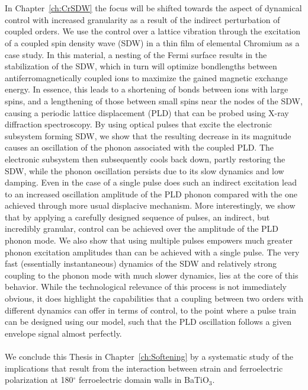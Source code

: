 \\\\
In Chapter~\ref{ch:CrSDW} the focus will be shifted towards the aspect of dynamical control with increased granularity as a result of the indirect perturbation of coupled orders.
We use the control over a lattice vibration through the excitation of a coupled spin density wave (SDW) in a thin film of elemental Chromium as a case study.
In this material, a nesting of the Fermi surface results in the stabilization of the SDW, which in turn will optimize bondlengths between antiferromagnetically coupled ions to maximize the gained magnetic exchange energy.
In essence, this leads to a shortening of bonds between ions with large spins, and a lengthening of those between small spins near the nodes of the SDW, causing a periodic lattice displacement (PLD) that can be probed using X-ray diffraction spectroscopy.
By using optical pulses that excite the electronic subsystem forming SDW, we show that the resulting  decrease in its magnitude causes an oscillation of the phonon associated with the coupled PLD.
The electronic subsystem then subsequently cools back down, partly restoring the SDW, while the phonon oscillation persists due to its slow dynamics and low damping.
Even in the case of a single pulse does such an indirect excitation lead to an increased oscillation amplitude of the PLD phonon compared with the one achieved through more usual displacive mechanism.
More interestingly, we show that by applying a carefully designed sequence of pulses, an indirect, but incredibly granular, control can be achieved over the amplitude of the PLD phonon mode.
We also show that using multiple pulses empowers much greater phonon excitation amplitudes than can be achieved with a single pulse.
The very fast (essentially instantaneous) dynamics of the SDW and relatively strong coupling to the phonon mode with much slower dynamics, lies at the core of this behavior.
While the technological relevance of this process is not immediately obvious, it does highlight the capabilities that a coupling between two orders with different dynamics can offer in terms of control, to the point where a pulse train can be designed using our model, such that the PLD oscillation follows a given envelope signal almost perfectly.
\\\\
We conclude this Thesis in Chapter~\ref{ch:Softening} by a systematic study of the implications that result from the interaction between strain and ferroelectric polarization at 180$^\circ$ ferroelectric domain walls in BaTiO$_3$.
